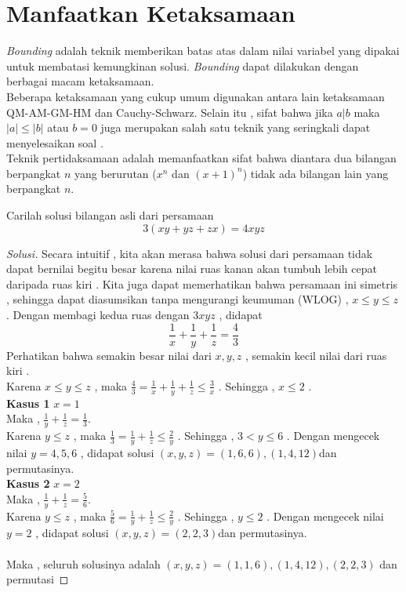 \documentclass[11pt]{scrartcl}
\begin{document}
\section{Manfaatkan Ketaksamaan}
\textit{Bounding} adalah teknik memberikan batas atas dalam nilai variabel yang dipakai untuk membatasi kemungkinan solusi. \textit{Bounding} dapat dilakukan dengan berbagai macam ketaksamaan.\\
Beberapa ketaksamaan yang cukup umum digunakan antara lain ketaksamaan QM-AM-GM-HM dan Cauchy-Schwarz. Selain itu , sifat bahwa jika $a|b$ maka $|a|\leq|b|$ atau $b=0$ juga merupakan salah satu teknik yang seringkali dapat menyelesaikan soal . \\
Teknik pertidaksamaan adalah memanfaatkan sifat bahwa diantara dua bilangan berpangkat $n$ yang berurutan ($x^n$ dan $(x+1)^n$) tidak ada bilangan lain yang berpangkat $n$. \\

\begin{example}
    Carilah solusi bilangan asli dari persamaan $$3(xy+yz+zx)=4xyz$$
\end{example}
    
\begin{proof}[Solusi]
    Secara intuitif , kita akan merasa bahwa solusi dari persamaan tidak dapat bernilai begitu besar karena nilai ruas kanan akan tumbuh lebih cepat daripada ruas kiri . Kita juga dapat memerhatikan bahwa persamaan ini simetris , sehingga dapat diasumsikan tanpa mengurangi keumuman (WLOG) , $x\leq y\leq z$ . Dengan membagi kedua ruas dengan $3xyz$ , didapat $$\frac{1}{x}+\frac{1}{y}+\frac{1}{z}=\frac{4}{3}$$
    Perhatikan bahwa semakin besar nilai dari $x,y,z$ , semakin kecil nilai dari ruas kiri . \\
    Karena $x\leq y\leq z$ , maka $\frac{4}{3}=\frac{1}{x}+\frac{1}{y}+\frac{1}{z}\leq\frac{3}{x}$ .
    Sehingga , $x\leq 2$ .\\
    \textbf{Kasus 1} $x=1$\\
    Maka , $\frac{1}{y}+\frac{1}{z}=\frac{1}{3}$.\\
    Karena $y\leq z$ , maka $\frac{1}{3}=\frac{1}{y}+\frac{1}{z}\leq\frac{2}{y}$ .
    Sehingga , $3<y\leq 6$ . Dengan mengecek nilai $y=4,5,6$ , didapat solusi $(x,y,z)=(1,6,6),(1,4,12)$dan permutasinya.\\
    \textbf{Kasus 2} $x=2$ \\
    Maka , $\frac{1}{y}+\frac{1}{z}=\frac{5}{6}$.\\
    Karena $y\leq z$ , maka $\frac{5}{6}=\frac{1}{y}+\frac{1}{z}\leq\frac{2}{y}$ .
    Sehingga , $y\leq 2$ . Dengan mengecek nilai $y=2$ , didapat solusi $(x,y,z)=(2,2,3)$dan permutasinya.\\
    \\
    Maka , seluruh solusinya adalah $(x,y,z)=(1,1,6),(1,4,12),(2,2,3)$ dan permutasi
\end{proof}
\end{document}
